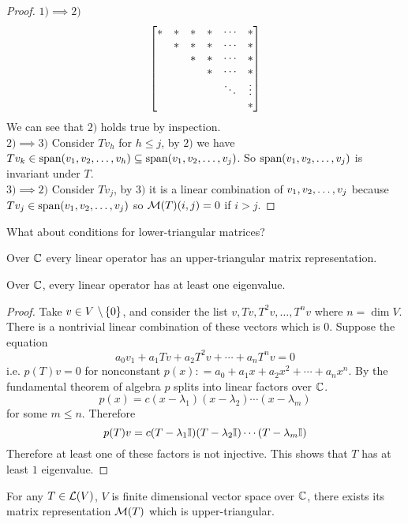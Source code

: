 \begin{proof}
    $1) \implies 2) $ \[\begin{bmatrix} * & * & * & * & \cdots & * \\  & * & * & * & \cdots & * \\  &  & * & * & \cdots & * \\ & & & * & \cdots & * \\  & & & & \ddots & \vdots \\  & & & & & * \end{bmatrix}\] We can see that $2)$ holds true by inspection. \\
    $2) \implies 3)$ Consider $Tv_h$ for $h \leq j$, by $2)$ we have $Tv_k \in \text{span}({v}_1,{v}_2, \ldots, {v}_{h}) \subseteq \text{span} ({v}_1,{v}_2, \ldots, {v}_{j})$. So $\text{span} ({v}_1,{v}_2, \ldots, {v}_{j})$ is invariant under $T$. \\
    $3) \implies 2)$ Consider $Tv_j$, by $3)$ it is a linear combination of ${v}_1,{v}_2, \ldots, {v}_{j}$ because $Tv_j \in \text{span}({v}_1,{v}_2, \ldots, {v}_{j})$ so $\mathcal M(T)(i,j) = 0$ if $i > j$.
\end{proof}
\begin{question}
    What about conditions for lower-triangular matrices?
\end{question}
\begin{theorem}
    Over $\mathbb C$ every linear operator has an upper-triangular matrix representation.
\end{theorem}
\begin{lemma}
Over $\mathbb C$, every linear operator has at least one eigenvalue.
\end{lemma}
\begin{proof}
    Take $v \in V\ \backslash \left\{ 0 \right\}$, and consider the list $v, Tv, T^2v, \ldots, T^nv$ where $n = \dim V$. There is a nontrivial linear combination of these vectors which is $0$. Suppose the equation \[a_0v_1 + a_1Tv + a_2T^2v + \cdots + a_nT^nv = 0\]
    i.e. $p(T)v = 0$ for nonconstant $p(x) : = a_0 + a_1x + a_2x^2 + \cdots + a_nx^n$. By the fundamental theorem of algebra $p$ splits into linear factors over $\mathbb C$.
    \[ p(x) = c(x - \lambda_1)(x - \lambda_2) \cdots (x - \lambda_m)\] for some $m \leq n$. Therefore 
    \[ p(T)v = c(T - \lambda_1 \mathbb I)(T - \lambda_2  \mathbb I) \cdots (T - \lambda_m \mathbb I)\]
    Therefore at least one of these factors is not injective. This shows that $T$ has at least $1$ eigenvalue.
\end{proof}
\begin{theorem}
    For any $T \in \mathcal L(V)$, $V$ is finite dimensional vector space over $\mathbb C$, there exists its matrix representation $\mathcal M(T)$ which is upper-triangular.
\end{theorem}

